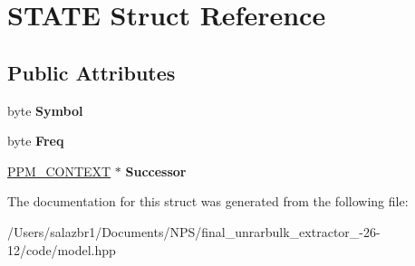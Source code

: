 \hypertarget{struct_s_t_a_t_e}{\section{S\-T\-A\-T\-E Struct Reference}
\label{struct_s_t_a_t_e}
}
\subsection*{Public Attributes}
\begin{DoxyCompactItemize}
\item 
\hypertarget{struct_s_t_a_t_e_aac7291ecff7f2ff9a4c1de981b8dd031}{byte {\bfseries Symbol}}\label{struct_s_t_a_t_e_aac7291ecff7f2ff9a4c1de981b8dd031}

\item 
\hypertarget{struct_s_t_a_t_e_a737b0336d10eb53b73c112f02795285e}{byte {\bfseries Freq}}\label{struct_s_t_a_t_e_a737b0336d10eb53b73c112f02795285e}

\item 
\hypertarget{struct_s_t_a_t_e_a177ed959ff59e0b0fcc5f0177670da88}{\hyperlink{struct_p_p_m___c_o_n_t_e_x_t}{P\-P\-M\-\_\-\-C\-O\-N\-T\-E\-X\-T} $\ast$ {\bfseries Successor}}\label{struct_s_t_a_t_e_a177ed959ff59e0b0fcc5f0177670da88}

\end{DoxyCompactItemize}


The documentation for this struct was generated from the following file\-:\begin{DoxyCompactItemize}
\item 
/\-Users/salazbr1/\-Documents/\-N\-P\-S/final\-\_\-unrarbulk\-\_\-extractor\-\_-\/26-\/12/code/model.\-hpp\end{DoxyCompactItemize}
